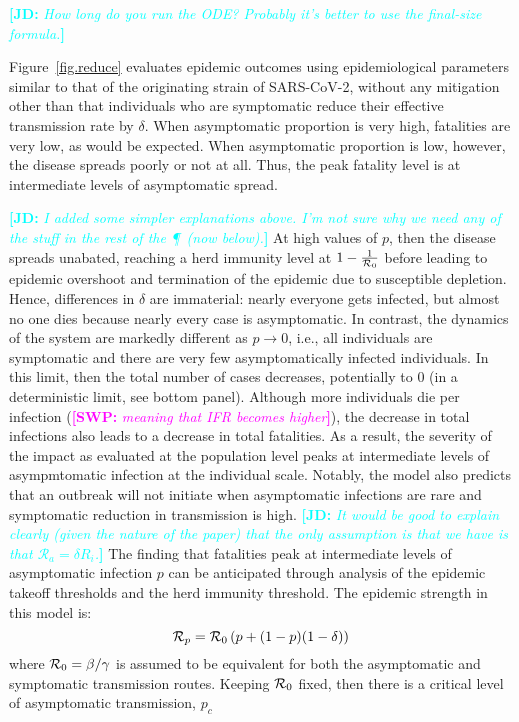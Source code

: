\documentclass[12pt]{article}
\newcommand{\comment}{\showcomment}
\newcommand{\showcomment}[3]{\textcolor{#1}{\textbf{[#2: }\textsl{#3}\textbf{]}}}
\newcommand{\jd}[1]{\comment{cyan}{JD}{#1}}
\newcommand{\swp}[1]{\comment{magenta}{SWP}{#1}}
\newcommand{\RR}{\ensuremath{{\mathcal R}}\xspace}
\begin{document}
\jd{How long do you run the ODE? Probably it's better to use the final-size formula.}


Figure~\ref{fig.reduce} evaluates epidemic outcomes using epidemiological parameters similar to that of the originating strain of SARS-CoV-2, without any mitigation other than that individuals who are symptomatic reduce their effective transmission rate by $\delta$. 
When asymptomatic proportion is very high, fatalities are very low, as would be expected.
When asymptomatic proportion is low, however, the disease spreads poorly or not at all.
Thus, the peak fatality level is at intermediate levels of asymptomatic spread.  

\jd{I added some simpler explanations above. I'm not sure why we need any of the stuff in the rest of the \P\ (now below).}
At high values of $p$, then the disease spreads unabated, reaching a herd immunity level at $1-\frac{1}{{\cal{R}}_0}$ before leading to epidemic overshoot and termination of the epidemic due to susceptible
depletion. 
Hence, differences in $\delta$ are immaterial: nearly everyone gets infected, but almost no one dies because nearly every case is asymptomatic.  
In contrast, the dynamics of the system are markedly different as $p\rightarrow 0$, i.e., all individuals are symptomatic and there are very few asymptomatically infected individuals. 
In this limit, then the total number of cases decreases, potentially to 0 (in a deterministic limit, see bottom panel). 
Although more individuals die per infection (\swp{meaning that IFR becomes higher}), the decrease in total infections also leads to a decrease in total fatalities. 
As a result, the severity of the impact as evaluated at the population level peaks at intermediate levels of asympmtomatic infection at the individual scale. Notably, the model also predicts that an outbreak will not initiate
when asymptomatic infections are rare and symptomatic reduction in transmission is high.
\jd{It would be good to explain clearly (given the nature of the paper) that the only assumption is that we have is that $\RR_a = \delta R_i$.}
The finding that fatalities peak at intermediate levels of asymptomatic infection $p$ can be
anticipated through analysis of the epidemic takeoff thresholds and the herd immunity threshold. The epidemic strength in this model is:
\begin{equation}
    {\cal{R}}_p = {\cal{R}}_0\left(p+(1-p)(1-\delta)\right)
\end{equation}
where ${\cal{R}}_0=\beta/\gamma$ is assumed to be equivalent for both the asymptomatic and symptomatic transmission routes. Keeping ${\cal{R}}_0$ fixed, then there is a critical level of asymptomatic transmission, $p_c$
\end{document}
